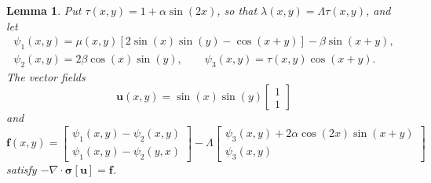 \documentclass[a4paper,12pt]{article}
\newcommand{\bs}[1]{\boldsymbol{#1}}
\newtheorem{lemma}[theorem]{Lemma}
\begin{document}
\begin{lemma}\label{lem: elasticity extra soln}
Put $\tau(x,y)=1+\alpha\sin(2x)$, so that $\lambda(x,y)=\Lambda\tau(x,y)$, and
let
\begin{gather*}
\psi_1(x,y)=\mu(x,y)[2\sin(x)\sin(y)-\cos(x+y)]-\beta\sin(x+y),\\
\psi_2(x,y)=2\beta\cos(x)\sin(y),\qquad
\psi_3(x,y)=\tau(x,y)\cos(x+y).
\end{gather*}
The vector fields
\[
\bs{u}(x,y)=\sin(x)\sin(y)\begin{bmatrix}1\\ 1 \end{bmatrix}
\]
and
\[
\bs{f}(x,y)=\begin{bmatrix}
\psi_1(x,y)-\psi_2(x,y)\\
\psi_1(x,y)-\psi_2(y,x)\end{bmatrix}
-\Lambda\begin{bmatrix}
\psi_3(x,y)+2\alpha\cos(2x)\sin(x+y)\\
\psi_3(x,y)\end{bmatrix}
\]
satisfy $-\nabla\cdot\bs{\sigma}[\bs{u}]=\bs{f}$.
\end{lemma}
\end{document}
